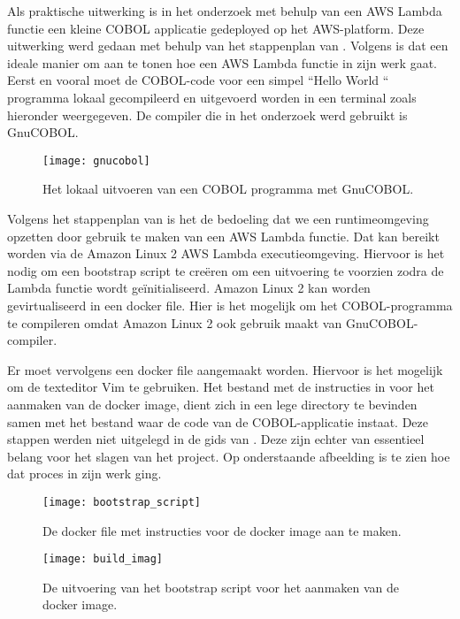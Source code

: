 \newpage

Als praktische uitwerking is in het onderzoek met behulp van een AWS Lambda functie een kleine COBOL applicatie gedeployed op het AWS-platform. Deze uitwerking werd gedaan met behulp van het stappenplan van \textcite{Paika2020}. Volgens \textcite{Paika2020} is dat een ideale manier om aan te tonen hoe een AWS Lambda functie in zijn werk gaat. Eerst en vooral moet de COBOL-code voor een simpel ``Hello World `` programma lokaal gecompileerd en uitgevoerd worden in een terminal zoals hieronder weergegeven. De compiler die in het onderzoek werd gebruikt is GnuCOBOL.  
    \begin{figure}[h]
        \centering
        \texttt{[image: gnucobol]}
        \caption{Het lokaal uitvoeren van een COBOL programma met GnuCOBOL.}
     \end{figure}
 
 \newpage
 
 Volgens het stappenplan van \textcite{Paika2020} is het de bedoeling dat we een runtimeomgeving opzetten door gebruik te maken van een AWS Lambda functie. Dat kan bereikt worden via de Amazon Linux 2 AWS Lambda executieomgeving. Hiervoor is het nodig om een bootstrap script te creëren om een uitvoering te voorzien zodra de Lambda functie wordt geïnitialiseerd. Amazon Linux 2 kan worden gevirtualiseerd in een docker file. Hier is het mogelijk om het COBOL-programma te compileren omdat Amazon Linux 2 ook gebruik maakt van GnuCOBOL-compiler. 
 
 Er moet vervolgens een docker file aangemaakt worden. Hiervoor is het mogelijk om de texteditor Vim te gebruiken. Het bestand met de instructies in voor het aanmaken van de docker image, dient zich in een lege directory te bevinden samen met het bestand waar de code van de COBOL-applicatie instaat. Deze stappen werden niet uitgelegd in de gids van \textcite{Paika2020}. Deze zijn echter van essentieel belang voor het slagen van het project. Op onderstaande afbeelding is te zien hoe dat proces in zijn werk ging. 
 
  \begin{figure}[h]
     \centering
     \texttt{[image: bootstrap\_script]}
     \caption{De docker file met instructies voor de docker image aan te maken.}
 \end{figure}

  \begin{figure}[h]
    \centering
    \texttt{[image: build\_imag]}
    \caption{De uitvoering van het bootstrap script voor het aanmaken van de docker image.}
\end{figure}

